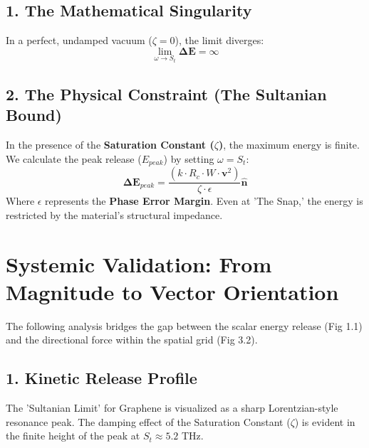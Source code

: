 \documentclass[11pt]{article}
\begin{document}
\subsection*{1. The Mathematical Singularity}
In a perfect, undamped vacuum ($\zeta = 0$), the limit diverges:
\begin{equation}
    \lim_{\omega \to S_t} \mathbf{\Delta E} = \infty
\end{equation}

\subsection*{2. The Physical Constraint (The Sultanian Bound)}
In the presence of the \textbf{Saturation Constant ($\zeta$)}, the maximum energy is finite. We calculate the peak release ($E_{peak}$) by setting $\omega = S_t$:
\begin{equation}
    \mathbf{\Delta E}_{peak} = \frac{(k \cdot R_c \cdot W \cdot \mathbf{v}^2)}{\zeta \cdot \epsilon} \mathbf{\hat{n}}
\end{equation}
Where $\epsilon$ represents the \textbf{Phase Error Margin}. Even at 'The Snap,' the energy is restricted by the material's structural impedance.

\section*{Systemic Validation: From Magnitude to Vector Orientation}

The following analysis bridges the gap between the scalar energy release (Fig 1.1) and the directional force within the spatial grid (Fig 3.2).

\subsection*{1. Kinetic Release Profile}
The 'Sultanian Limit' for Graphene is visualized as a sharp Lorentzian-style resonance peak. The damping effect of the Saturation Constant ($\zeta$) is evident in the finite height of the peak at $S_t \approx 5.2$ THz.
\end{document}
